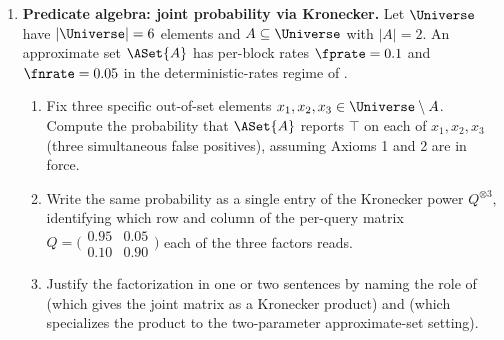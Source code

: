 \begin{enumerate}
\item \exstarstar
\label{ex:ch5-6}
\textbf{Predicate algebra: joint probability via Kronecker.}
Let $\Universe$ have $|\Universe| = 6$ elements and $A \subseteq
\Universe$ with $|A| = 2$. An approximate set $\ASet{A}$ has per-block
rates $\fprate = 0.1$ and $\fnrate = 0.05$ in the deterministic-rates
regime of .
\begin{enumerate}
  \item[(a)] Fix three specific out-of-set elements $x_1, x_2, x_3 \in
    \Universe \setminus A$. Compute the probability that $\ASet{A}$
    reports $\top$ on each of $x_1, x_2, x_3$ (three simultaneous
    false positives), assuming Axioms 1 and 2 are in force.
  \item[(b)] Write the same probability as a single entry of the
    Kronecker power $Q^{\otimes 3}$, identifying which row and column
    of the per-query matrix
    $Q = \bigl(\begin{smallmatrix} 0.95 & 0.05 \\ 0.10 & 0.90
    \end{smallmatrix}\bigr)$ each of the three factors reads.
  \item[(c)] Justify the factorization in one or two sentences by
    naming the role of  (which gives the joint
    matrix as a Kronecker product) and 
    (which specializes the product to the two-parameter approximate-set
    setting).
\end{enumerate}


\end{enumerate}
